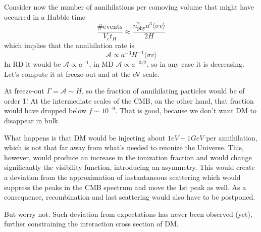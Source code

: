 Consider now the number of annihilations per comoving volume that might have occurred in a Hubble time 
\begin{equation}
    \frac{\text{\# events}}{V_{c}t_{H}} \approx \frac{n_{\text{phy}}^{2}a^{3}\langle \sigma v \rangle}{2H}
\end{equation}
which implies that the annihilation rate is 
\begin{equation}
    \mathcal{A} \propto a^{-3}H^{-1}\langle \sigma v \rangle
\end{equation}
In RD it would be $\mathcal{A} \propto a^{-1}$, in MD $\mathcal{A}\propto a^{-3/2}$, so in any case it is decreasing. Let's compute it at freeze-out and at the eV scale. 
\par At freeze-out $\Gamma = \mathcal{A}\sim H$, so the fraction of annihilating particles would be of order 1! At the intermediate scales of the CMB, on the other hand, that fraction would have dropped below $f\sim 10^{-9}$. That is good, because we don't want DM to disappear in bulk.
\par What happens is that DM would be injecting about $1\unit{eV}-1\unit{GeV}$ per annihilation, which is not that far away from what's needed to reionize the Universe. This, however, would produce an increase in the ionization fraction and would change significantly the visibility function, introducing an asymmetry. This would create a deviation from the approximation of instantaneous scattering which would suppress the peaks in the CMB spectrum and move the 1st peak as well. As a consequence, recombination and last scattering would also have to be postponed.
\par But worry not. Such deviation from expectations has never been observed (yet), further constraining the interaction cross section of DM.